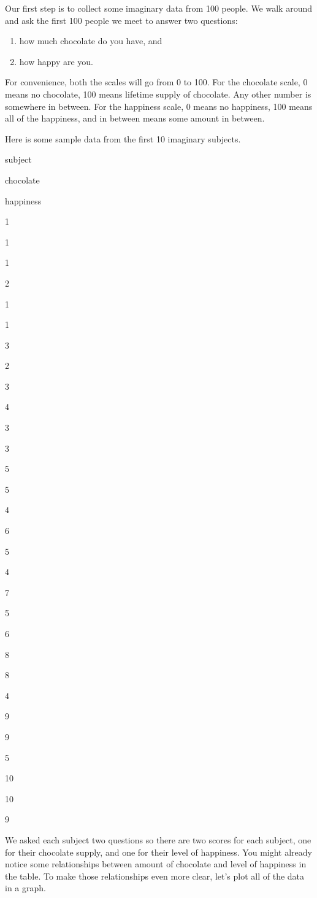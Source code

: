 \documentclass[
]{book}
\providecommand{\tightlist}{%
  \setlength{\itemsep}{0pt}\setlength{\parskip}{0pt}}
\begin{document}
Our first step is to collect some imaginary data from 100 people. We walk around and ask the first 100 people we meet to answer two questions:

\begin{enumerate}
\def\labelenumi{\arabic{enumi}.}
\tightlist
\item
  how much chocolate do you have, and
\item
  how happy are you.
\end{enumerate}

For convenience, both the scales will go from 0 to 100. For the chocolate scale, 0 means no chocolate, 100 means lifetime supply of chocolate. Any other number is somewhere in between. For the happiness scale, 0 means no happiness, 100 means all of the happiness, and in between means some amount in between.

Here is some sample data from the first 10 imaginary subjects.

subject

chocolate

happiness

1

1

1

2

1

1

3

2

3

4

3

3

5

5

4

6

5

4

7

5

6

8

8

4

9

9

5

10

10

9

We asked each subject two questions so there are two scores for each subject, one for their chocolate supply, and one for their level of happiness. You might already notice some relationships between amount of chocolate and level of happiness in the table. To make those relationships even more clear, let's plot all of the data in a graph.
\end{document}
